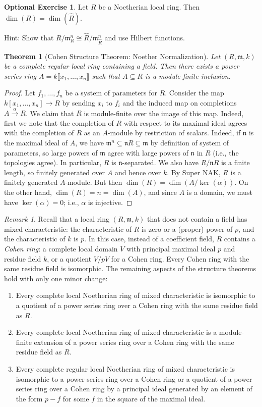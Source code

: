 \documentclass{amsart}[12pt]
\def\ker{\operatorname{ker}}
\newcommand{\fm}{{\mathfrak m}}
\newcommand{\fn}{{\mathfrak n}}
\numberwithin{equation}{section}
\theoremstyle{plain} %
\newtheorem{thm}[equation]{Theorem}
\theoremstyle{definition}
\newtheorem{exer}[equation]{Optional Exercise}
\theoremstyle{remark}
\newtheorem{rem}[equation]{Remark}
\newcommand{\xra}[1]{\xrightarrow{#1}}
\begin{document}
\begin{exer} Let $R$ be a Noetherian local ring. Then $\dim(R) = \dim(\hat{R})$.
\end{exer}
Hint: Show that $R/\fm_R^n \cong \hat{R}/ \fm_{\hat{R}}^n$ and use Hilbert functions.

\begin{thm}[Cohen Structure Theorem: Noether Normalization] Let $(R,\fm,k)$ be a complete regular local ring containing a field. Then there exists a power series ring $A=k\llbracket x_1,\dots,x_n\rrbracket$ such that $A\subseteq R$ is a module-finite inclusion.
\end{thm}
\begin{proof}
Let $f_1,\dots,f_n$ be a system of parameters for $R$. Consider the map $k[x_1,\dots,x_n]\to R$ by sending $x_i$ to $f_i$ and the induced map on completions $A\xra{\alpha} R$. We claim that $R$ is module-finite over the image of this map. Indeed, first we note that the completion of $R$ with respect to its maximal ideal agrees with the completion of $R$ as an $A$-module by restriction of scalars. Indeed, if $\fn$ is the maximal ideal of $A$, we have $\fm^n \subseteq \fn R \subseteq \fm$ by definition of system of parameters, so large powers of $\fm$ agree with large powers of $\fn$ in $R$ (i.e., the topologies agree). In particular, $R$ is $\fn$-separated. We also have $R/\fn R$ is a finite length, so finitely generated over $A$ and hence over $k$. By Super NAK, $R$ is a finitely generated $A$-module. But then $\dim(R) = \dim(A/\ker(\alpha))$. On the other hand, $\dim(R) = n = \dim(A)$, and since $A$ is a domain, we must have $\ker(\alpha)=0$; i.e., $\alpha$ is injective.
\end{proof}

\begin{rem} Recall that a local ring $(R,\fm,k)$ that does not contain a field has mixed characteristic: the characteristic of $R$ is zero or a (proper) power of $p$, and the characteristic of $k$ is $p$. In this case, instead of a coefficient field, $R$ contains a \emph{Cohen ring}: a complete local domain $V$ with principal maximal ideal $p$ and residue field $k$, or a quotient $V/pV$ for a Cohen ring. Every Cohen ring with the same residue field is isomorphic. The remaining aspects of the structure theorems hold with only one minor change:
\begin{enumerate}
\item Every complete local Noetherian ring of mixed characteristic is isomorphic to a quotient of a power series ring over a Cohen ring with the same residue field as $R$.
\item Every complete local Noetherian ring of mixed characteristic is a module-finite extension of a power series ring over a Cohen ring with the same residue field as $R$.
\item Every complete regular local Noetherian ring of mixed characteristic is isomorphic to a power series ring over a Cohen ring or a quotient of a power series ring over a Cohen ring by a principal ideal generated by an element of the form $p-f$ for some $f$ in the square of the maximal ideal.
\end{enumerate}
\end{rem}
\end{document}
